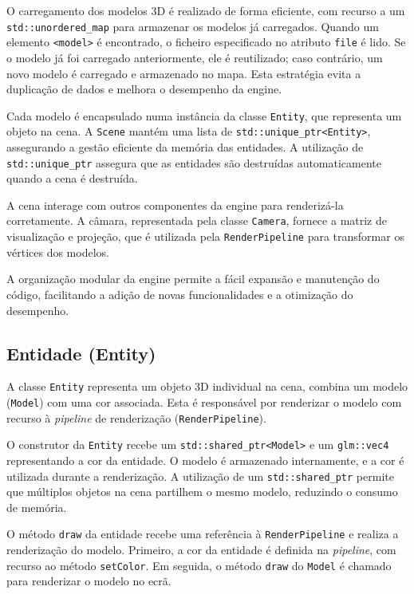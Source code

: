 \documentclass[12pt, a4paper]{article}
\begin{document}
O carregamento dos modelos 3D é realizado de forma eficiente, com recurso a um
\texttt{std::unordered\_map} para armazenar os modelos já carregados. Quando um elemento
\texttt{<model>} é encontrado, o ficheiro especificado no atributo \texttt{file} é lido.
Se o modelo já foi carregado anteriormente, ele é reutilizado; caso contrário, um novo modelo é
carregado e armazenado no mapa. Esta estratégia evita a duplicação de dados e melhora o desempenho
da engine.

Cada modelo é encapsulado numa instância da classe \texttt{Entity}, que representa um
objeto na cena. A \texttt{Scene} mantém uma lista de \texttt{std::unique\_ptr<Entity>}, assegurando
a gestão eficiente da memória das entidades. A utilização de \texttt{std::unique\_ptr} assegura que
as entidades são destruídas automaticamente quando a cena é destruída.

A cena interage com outros componentes da engine para renderizá-la corretamente. A câmara,
representada pela classe \texttt{Camera}, fornece a matriz de visualização e projeção, que é
utilizada pela \texttt{RenderPipeline} para transformar os vértices dos modelos.

A organização modular da engine permite a fácil expansão e manutenção do código, facilitando a
adição de novas funcionalidades e a otimização do desempenho.

\subsection{Entidade (Entity)}

A classe \texttt{Entity} representa um objeto 3D individual na cena, combina um modelo
(\texttt{Model}) com uma cor associada. Esta é responsável por renderizar o modelo com recurso à
\textit{pipeline} de renderização (\texttt{RenderPipeline}).

O construtor da \texttt{Entity} recebe um \texttt{std::shared\_ptr<Model>} e um \texttt{glm::vec4}
representando a cor da entidade. O modelo é armazenado internamente, e a cor é utilizada durante a
renderização. A utilização de um \texttt{std::shared\_ptr} permite que múltiplos objetos na cena
partilhem o mesmo modelo, reduzindo o consumo de memória.

O método \texttt{draw} da entidade recebe uma referência à \texttt{RenderPipeline} e realiza a
renderização do modelo. Primeiro, a cor da entidade é definida na \textit{pipeline}, com recurso ao
método \texttt{setColor}. Em seguida, o método \texttt{draw} do \texttt{Model} é chamado para
renderizar o modelo no ecrã.
\end{document}

